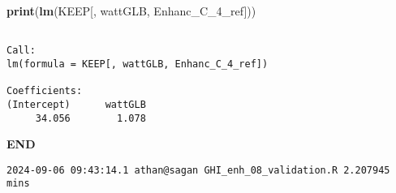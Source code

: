 \documentclass[
  10pt,
  a4paper,oneside]{article}
\newenvironment{Shaded}{\begin{snugshade}}{\end{snugshade}}
\newcommand{\FunctionTok}[1]{\textcolor[rgb]{0.13,0.29,0.53}{\textbf{#1}}}
\newcommand{\NormalTok}[1]{#1}
\begin{document}
\begin{Shaded}
\begin{Highlighting}[]
\FunctionTok{print}\NormalTok{(}\FunctionTok{lm}\NormalTok{(KEEP[, wattGLB, Enhanc\_C\_4\_ref]))}
\end{Highlighting}
\end{Shaded}

\begin{verbatim}

Call:
lm(formula = KEEP[, wattGLB, Enhanc_C_4_ref])

Coefficients:
(Intercept)      wattGLB  
     34.056        1.078  
\end{verbatim}

\textbf{END}

\begin{verbatim}
2024-09-06 09:43:14.1 athan@sagan GHI_enh_08_validation.R 2.207945 mins
\end{verbatim}
\end{document}
